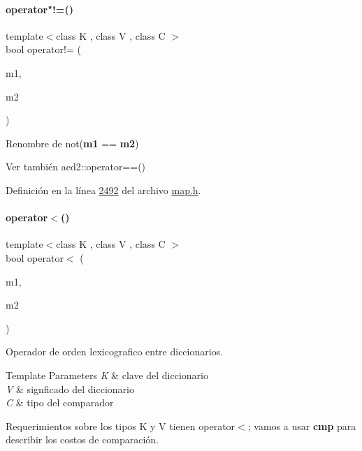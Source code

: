 \paragraph{\texorpdfstring{operator"!=()}{operator!=()}}
{\footnotesize\ttfamily template$<$class K , class V , class C $>$ \\
bool operator!= (\begin{DoxyParamCaption}\item[{const \hyperlink{classaed2_1_1map}{map}$<$ K, V, C $>$ \&}]{m1,  }\item[{const \hyperlink{classaed2_1_1map}{map}$<$ K, V, C $>$ \&}]{m2 }\end{DoxyParamCaption})\hspace{0.3cm}{\ttfamily [related]}}



Renombre de not({\bfseries m1} == {\bfseries m2}) 

\begin{DoxySeeAlso}{Ver también}
aed2\+::operator==() 
\end{DoxySeeAlso}


Definición en la línea \hyperlink{map_8h_source_l02492}{2492} del archivo \hyperlink{map_8h_source}{map.\+h}.

\mbox{\label{classaed2_1_1map_a8ff07f6a24c290ea7e8f63ec7ab24f8d_a8ff07f6a24c290ea7e8f63ec7ab24f8d}} 
\paragraph{\texorpdfstring{operator$<$()}{operator<()}}
{\footnotesize\ttfamily template$<$class K , class V , class C $>$ \\
bool operator$<$ (\begin{DoxyParamCaption}\item[{const \hyperlink{classaed2_1_1map}{map}$<$ K, V, C $>$ \&}]{m1,  }\item[{const \hyperlink{classaed2_1_1map}{map}$<$ K, V, C $>$ \&}]{m2 }\end{DoxyParamCaption})\hspace{0.3cm}{\ttfamily [related]}}



Operador de orden lexicografico entre diccionarios. 


\begin{DoxyTemplParams}{Template Parameters}
{\em K} & clave del diccionario \\
\hline
{\em V} & signficado del diccionario \\
\hline
{\em C} & tipo del comparador\\
\hline
\end{DoxyTemplParams}
\begin{DoxyParagraph}{Requerimientos sobre los tipos}
K y V tienen operator$<$; vamos a usar {\bfseries cmp} para describir los costos de comparación.
\end{DoxyParagraph}

